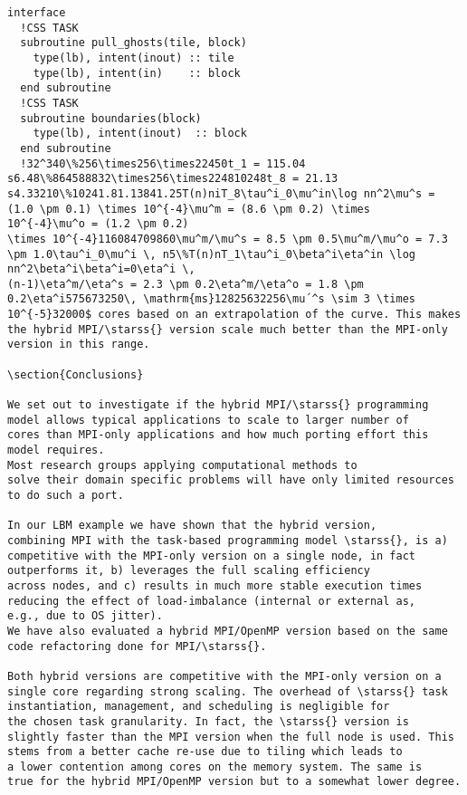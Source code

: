 \documentclass[conference]{IEEEtran}
\newcommand{\starss}{{StarSs}}
\begin{document}
\begin{lstlisting}
interface
  !CSS TASK
  subroutine pull_ghosts(tile, block)
    type(lb), intent(inout) :: tile
    type(lb), intent(in)    :: block
  end subroutine
  !CSS TASK
  subroutine boundaries(block)
    type(lb), intent(inout)  :: block
  end subroutine
  !32^340\%256\times256\times22450t_1 = 115.04 s6.48\%864588832\times256\times224810248t_8 = 21.13 s4.33210\%10241.81.13841.25T(n)niT_8\tau^i_0\mu^in\log nn^2\mu^s = (1.0 \pm 0.1) \times 10^{-4}\mu^m = (8.6 \pm 0.2) \times
10^{-4}\mu^o = (1.2 \pm 0.2)
\times 10^{-4}116084709860\mu^m/\mu^s = 8.5 \pm 0.5\mu^m/\mu^o = 7.3 \pm 1.0\tau^i_0\mu^i \, n5\%T(n)nT_1\tau^i_0\beta^i\eta^in \log nn^2\beta^i\beta^i=0\eta^i \,
(n-1)\eta^m/\eta^s = 2.3 \pm 0.2\eta^m/\eta^o = 1.8 \pm 0.2\eta^i575673250\, \mathrm{ms}12825632256\mu´^s \sim 3 \times 10^{-5}32000$ cores based on an extrapolation of the curve. This makes
the hybrid MPI/\starss{} version scale much better than the MPI-only
version in this range. 

\section{Conclusions}

We set out to investigate if the hybrid MPI/\starss{} programming
model allows typical applications to scale to larger number of
cores than MPI-only applications and how much porting effort this
model requires.
Most research groups applying computational methods to
solve their domain specific problems will have only limited resources
to do such a port.

In our LBM example we have shown that the hybrid version,
combining MPI with the task-based programming model \starss{}, is a)
competitive with the MPI-only version on a single node, in fact
outperforms it, b) leverages the full scaling efficiency
across nodes, and c) results in much more stable execution times
reducing the effect of load-imbalance (internal or external as,
e.g., due to OS jitter). 
We have also evaluated a hybrid MPI/OpenMP version based on the same
code refactoring done for MPI/\starss{}.

Both hybrid versions are competitive with the MPI-only version on a
single core regarding strong scaling. The overhead of \starss{} task
instantiation, management, and scheduling is negligible for
the chosen task granularity. In fact, the \starss{} version is
slightly faster than the MPI version when the full node is used. This
stems from a better cache re-use due to tiling which leads to 
a lower contention among cores on the memory system. The same is
true for the hybrid MPI/OpenMP version but to a somewhat lower degree.


\end{lstlisting}
\end{document}
